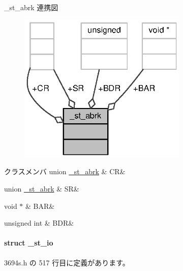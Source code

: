 \+\_\+st\+\_\+abrk 連携図
\nopagebreak
\begin{figure}[H]
\begin{center}
\leavevmode
\includegraphics[width=228pt]{d9/d5b/struct__st__abrk__coll__graph}
\end{center}
\end{figure}
\begin{DoxyFields}{クラスメンバ}
union \hyperlink{3694s_8h_d5/dc3/union__st__abrk_8CR}{\+\_\+st\+\_\+abrk}\label{3694s_8h_af9cb051ee0716830facb32e6e1ea1497}
&
C\+R&
\\
\hline

union \hyperlink{3694s_8h_d9/de2/union__st__abrk_8SR}{\+\_\+st\+\_\+abrk}\label{3694s_8h_ac42a6b6baa9505ea55caf7c9a3d3a7f5}
&
S\+R&
\\
\hline

void $\ast$\label{3694s_8h_adf66422858ad903262b94c330e2e39e1}
&
B\+A\+R&
\\
\hline

unsigned int\label{3694s_8h_a517e891dfb5003cfc6560161c4da5e64}
&
B\+D\+R&
\\
\hline

\end{DoxyFields}
\label{struct__st__io}
\paragraph{struct \+\_\+st\+\_\+io}


 3694s.\+h の 517 行目に定義があります。




